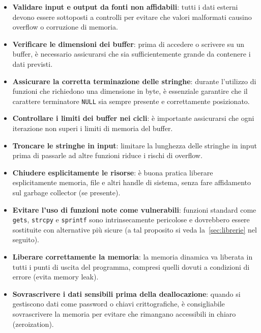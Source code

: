 \begin{itemize}
  \item \textbf{Validare input e output da fonti non affidabili}: tutti i dati esterni
    devono essere sottoposti a controlli per evitare che valori malformati causino
    overflow o corruzione di memoria.

  \item \textbf{Verificare le dimensioni dei buffer}: prima di accedere o scrivere
    su un buffer, è necessario assicurarsi che sia sufficientemente grande da
    contenere i dati previsti.

  \item \textbf{Assicurare la corretta terminazione delle stringhe}: durante l'utilizzo
    di funzioni che richiedono una dimensione in byte, è essenziale garantire
    che il carattere terminatore \texttt{NULL} sia sempre presente e correttamente
    posizionato.

  \item \textbf{Controllare i limiti dei buffer nei cicli}: è importante assicurarsi
    che ogni iterazione non superi i limiti di memoria del buffer.

  \item \textbf{Troncare le stringhe in input}: limitare la lunghezza delle stringhe
    in input prima di passarle ad altre funzioni riduce i rischi di overflow.

  \item \textbf{Chiudere esplicitamente le risorse}: è buona pratica liberare esplicitamente
    memoria, file e altri handle di sistema, senza fare affidamento sul garbage collector
    (se presente).

  \item \textbf{Evitare l'uso di funzioni note come vulnerabili}: funzioni standard
    come \texttt{gets}, \texttt{strcpy} e \texttt{sprintf} sono intrinsecamente pericolose
    e dovrebbero essere sostituite con alternative più sicure (a tal proposito
    si veda la~\autoref{sec:librerie} nel seguito).

  \item \textbf{Liberare correttamente la memoria}: la memoria dinamica va liberata
    in tutti i punti di uscita del programma, compresi quelli dovuti a
    condizioni di errore (evita memory leak).

  \item \textbf{Sovrascrivere i dati sensibili prima della deallocazione}: quando
    si gestiscono dati come password o chiavi crittografiche, è consigliabile
    sovrascrivere la memoria per evitare che rimangano accessibili in chiaro (zeroization).
\end{itemize}

